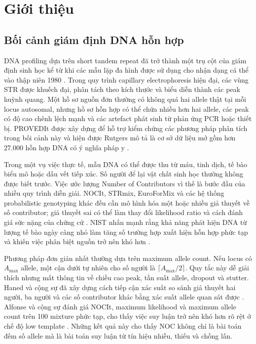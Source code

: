 \documentclass[12pt,a4paper]{article}
\begin{document}
\newpage
\section{Giới thiệu}

\subsection{Bối cảnh giám định DNA hỗn hợp}

DNA profiling dựa trên short tandem repeat đã trở thành một trụ cột của giám định sinh học kể từ khi các mẫu lặp đa hình được sử dụng cho nhận dạng cá thể vào thập niên 1980 \cite{jeffreys1985}. Trong quy trình capillary electrophoresis hiện đại, các vùng STR được khuếch đại, phân tách theo kích thước và biểu diễn thành các peak huỳnh quang. Một hồ sơ nguồn đơn thường có không quá hai allele thật tại mỗi locus autosomal, nhưng hồ sơ hỗn hợp có thể chứa nhiều hơn hai allele, các peak có độ cao chênh lệch mạnh và các artefact phát sinh từ phản ứng PCR hoặc thiết bị. PROVEDIt được xây dựng để hỗ trợ kiểm chứng các phương pháp phân tích trong bối cảnh này và hiện được Rutgers mô tả là cơ sở dữ liệu mở gồm hơn 27.000 hỗn hợp DNA có ý nghĩa pháp y \cite{provedit2018,proveditweb}.

Trong một vụ việc thực tế, mẫu DNA có thể được thu từ máu, tinh dịch, tế bào biểu mô hoặc dấu vết tiếp xúc. Số người để lại vật chất sinh học thường không được biết trước. Việc ước lượng Number of Contributors vì thế là bước đầu của nhiều quy trình diễn giải. NOCIt, STRmix, EuroForMix và các hệ thống probabilistic genotyping khác đều cần mô hình hóa một hoặc nhiều giả thuyết về số contributor; giả thuyết sai có thể làm thay đổi likelihood ratio và cách đánh giá sức nặng của chứng cứ \cite{haned2011,bleka2016,bright2016,coble2019}. NIST nhấn mạnh rằng khả năng phát hiện DNA từ lượng tế bào ngày càng nhỏ làm tăng số trường hợp xuất hiện hỗn hợp phức tạp và khiến việc phân biệt nguồn trở nên khó hơn \cite{nist2024}.

Phương pháp đơn giản nhất thường dựa trên maximum allele count. Nếu locus có \(A_{\max}\) allele, một cận dưới tự nhiên cho số người là \(\lceil A_{\max}/2\rceil\). Quy tắc này dễ giải thích nhưng mất thông tin về chiều cao peak, tần suất allele, dropout và stutter. Haned và cộng sự đã xây dựng cách tiếp cận xác suất so sánh giả thuyết hai người, ba người và các số contributor khác bằng xác suất allele quan sát được \cite{haned2011}. Alfonse và cộng sự đánh giá NOCIt, maximum likelihood và maximum allele count trên 100 mixture phức tạp, cho thấy việc suy luận trở nên khó hơn rõ rệt ở chế độ low template \cite{alfonse2017}. Những kết quả này cho thấy NOC không chỉ là bài toán đếm số allele mà là bài toán suy luận từ tín hiệu nhiễu, thiếu và chồng lấn.
\end{document}
